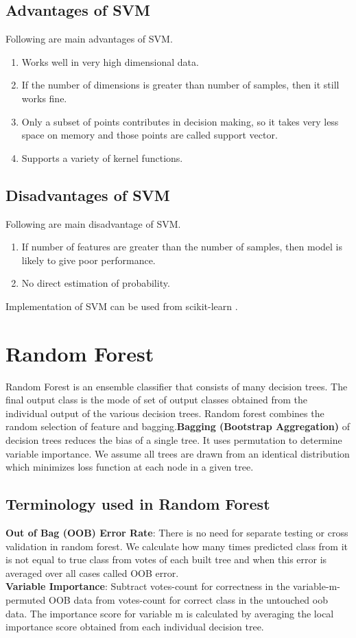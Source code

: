\documentclass[11pt]{report}
\begin{document}
\subsection{Advantages of SVM}
Following are main advantages of SVM.
\begin{enumerate}
\item Works well in very high dimensional data.
\item If the number of dimensions is greater than number of samples, then  it still works fine.
\item Only a subset of points contributes in decision making, so it takes very less space on memory and those points are called support vector.
\item Supports a variety of kernel functions.
\end{enumerate}
 
\subsection{Disadvantages of SVM}
Following are main disadvantage of SVM.        
\begin{enumerate}
\item If number of features are greater than the number of samples, then model  is likely to give poor performance.
\item No direct estimation of probability. 
\end{enumerate}
Implementation of SVM can be used from scikit-learn \cite{sklearn}.

\newpage
\section{Random Forest}
Random Forest is an ensemble classifier that consists of many decision trees. The final output class is the mode of set of output classes obtained from the individual output of the various decision trees. Random forest combines the random selection of feature and bagging.\textbf{Bagging (Bootstrap Aggregation) }of decision trees reduces the bias of a single tree. It uses permutation to determine variable importance. We assume all trees are drawn from an identical distribution which minimizes loss function at each node in a given tree.\\

\subsection{Terminology used in Random Forest }
\textbf{Out of Bag (OOB) Error Rate}: There is no need for separate testing or cross validation in random forest. We calculate how many times predicted class from it is not equal to true class from votes of each built tree and when this error is averaged over all cases called OOB error.\\
\textbf{Variable Importance}: Subtract votes-count for correctness in the variable-m-permuted OOB data from votes-count for correct class in the untouched oob data. The importance score for variable m is calculated by averaging the local importance score obtained from each individual decision tree.
\end{document}
